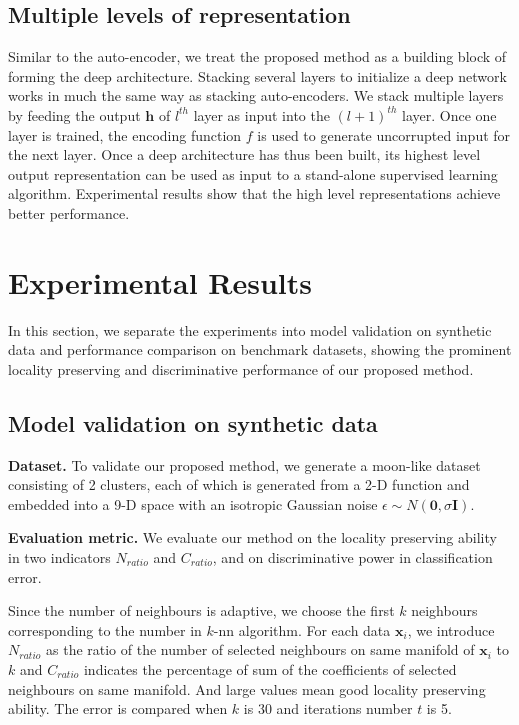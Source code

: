 \documentclass{article}
\def \x{\mathbf x}
\def \h{\mathbf h}
\def \0{{\mathbf 0}}
\def \I{\mathbf I}
\begin{document}
\subsection{Multiple levels of representation}
Similar to the auto-encoder, we treat the proposed method as a building block of forming the deep architecture.  Stacking several layers to initialize a deep network works in much the same way as stacking auto-encoders. We stack multiple layers by feeding the output $\h$ of $l^{th}$ layer as input into the $(l+1)^{th}$ layer. Once one layer is trained, the encoding function $f$ is used to generate uncorrupted input for the next layer.  Once a deep architecture has thus been built, its highest level output representation can be used as input to a stand-alone supervised learning algorithm. Experimental results show that the high level representations achieve better performance.

\section{Experimental Results}
In this section,
we separate the experiments into
model validation on synthetic data
and performance comparison on benchmark datasets,
showing the prominent locality preserving and discriminative performance
of our proposed method.

\subsection{Model validation on synthetic data}

{\bf Dataset.}
To validate our proposed method,
we generate a moon-like dataset consisting of 2 clusters,
each of which is generated from a 2-D function
and embedded into a 9-D space with an isotropic Gaussian noise $\epsilon\sim N(\0,\sigma\I)$.

{\bf Evaluation metric.}
We evaluate our method
on the locality preserving ability in two indicators $N_{ratio}$ and $C_{ratio}$,
and on discriminative power in classification error.

Since the number of neighbours is adaptive,
we choose the first $k$ neighbours corresponding to the number in $k$-nn algorithm.
For each data $\x_i$,
we introduce $N_{ratio}$ as the ratio of the number of selected neighbours on same manifold of $\x_i$ to $k$
and $C_{ratio}$ indicates the percentage of sum of the coefficients of selected neighbours on same manifold.
And large values mean good locality preserving ability.
The error is compared when $k$ is $30$ and iterations number $t$ is 5.
\end{document}
